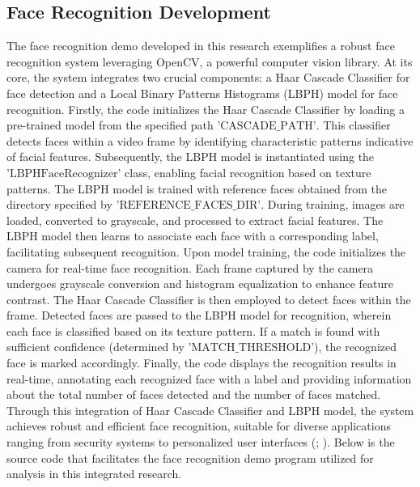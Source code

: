 \documentclass[
]{article}
\begin{document}
\begin{multicols}{2}

\section{Face Recognition Development}
The face recognition demo developed in this research exemplifies a robust face recognition system leveraging OpenCV, a powerful computer vision library. At its core, the system integrates two crucial components: a Haar Cascade Classifier for face detection and a Local Binary Patterns Histograms (LBPH) model for face recognition. Firstly, the code initializes the Haar Cascade Classifier by loading a pre-trained model from the specified path \( \text{'CASCADE\_PATH'} \). This classifier detects faces within a video frame by identifying characteristic patterns indicative of facial features. Subsequently, the LBPH model is instantiated using the \( \text{'LBPHFaceRecognizer'} \) class, enabling facial recognition based on texture patterns. The LBPH model is trained with reference faces obtained from the directory specified by \( \text{'REFERENCE\_FACES\_DIR'} \). During training, images are loaded, converted to grayscale, and processed to extract facial features. The LBPH model then learns to associate each face with a corresponding label, facilitating subsequent recognition. Upon model training, the code initializes the camera for real-time face recognition. Each frame captured by the camera undergoes grayscale conversion and histogram equalization to enhance feature contrast. The Haar Cascade Classifier is then employed to detect faces within the frame. Detected faces are passed to the LBPH model for recognition, wherein each face is classified based on its texture pattern. If a match is found with sufficient confidence (determined by \( \text{'MATCH\_THRESHOLD'} \)), the recognized face is marked accordingly. Finally, the code displays the recognition results in real-time, annotating each recognized face with a label and providing information about the total number of faces detected and the number of faces matched. Through this integration of Haar Cascade Classifier and LBPH model, the system achieves robust and efficient face recognition, suitable for diverse applications ranging from security systems to personalized user interfaces (\cite{deng2010}; \cite{ahonen2004}). Below is the source code that facilitates the face recognition demo program utilized for analysis in this integrated research.

\end{multicols}
\end{document}
